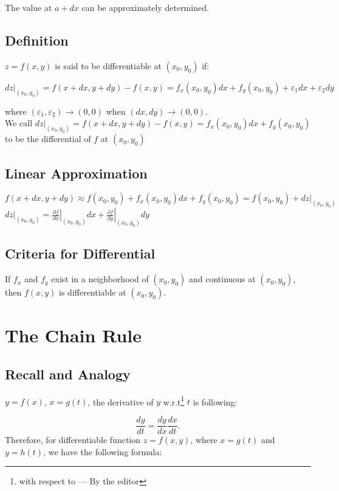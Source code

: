 \documentclass[UTF8,a4paper, 10pt, openany]{svmono}
\begin{document}
The value at $a+dx$ can be approximately determined.
\subsection{Definition}
$z=f(x,y)$ is said to be differentiable at $(x_0,y_0)$ if:

\begin{center}
$dz|_{(x_0,y_0)}=f(x+dx,y+dy)-f(x,y)=f_x(x_0,y_0)dx+f_y(x_0,y_0)+\varepsilon_1dx+\varepsilon_2dy$
\end{center}

where $(\varepsilon_1,\varepsilon_2)\to (0,0)$ when $(dx,dy)\to (0,0)$.\\

We call $dz|_{(x_0,y_0)}=f(x+dx,y+dy)-f(x,y)=f_x(x_0,y_0)dx+f_y(x_0,y_0)$ to be the differential of $f$ at $(x_0,y_0)$
\subsection{Linear Approximation}
\begin{center}
$f(x+dx,y+dy)\approx f(x_0,y_0)+f_x(x_0,y_0)dx+f_y(x_0,y_0)=f(x_0,y_0)+dz|_{(x_0,y_0)}$\\
$dz|_{(x_0,y_0)}=\left. \frac{\partial f}{\partial x} \right|_{(x_0,y_0)}dx + 	\left.\frac{\partial f}{\partial y} \right|_{(x_0,y_0)}dy$
\end{center}
\subsection{Criteria for Differential}
If $f_x$ and $f_y$ exist in a neighborhood of $(x_0,y_0)$ and continuous at $(x_0,y_0)$, then $f(x,y)$ is differentiable at $(x_0,y_0)$.

\section{The Chain Rule}
\subsection{Recall and Analogy}
$y=f(x)$, $x=g(t)$, the derivative of $y$ w.r.t\footnote{with respect to --- By the editor} $t$ is following:

\[\frac{dy}{dt}=\frac{dy}{dx}\frac{dx}{dt}.\]
Therefore, for differentiable function $z=f(x,y)$, where $x=g(t)$ and $y=h(t)$, we have the following formula:
\end{document}
